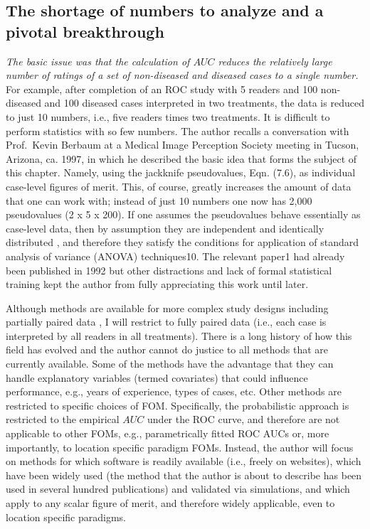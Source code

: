 \documentclass[
]{book}
\begin{document}
\hypertarget{the-shortage-of-numbers-to-analyze-and-a-pivotal-breakthrough}{%
\subsection{The shortage of numbers to analyze and a pivotal breakthrough}\label{the-shortage-of-numbers-to-analyze-and-a-pivotal-breakthrough}}

\emph{The basic issue was that the calculation of \(AUC\) reduces the relatively large number of ratings of a set of non-diseased and diseased cases to a single number.} For example, after completion of an ROC study with 5 readers and 100 non-diseased and 100 diseased cases interpreted in two treatments, the data is reduced to just 10 numbers, i.e., five readers times two treatments. It is difficult to perform statistics with so few numbers. The author recalls a conversation with Prof.~Kevin Berbaum at a Medical Image Perception Society meeting in Tucson, Arizona, ca. 1997, in which he described the basic idea that forms the subject of this chapter. Namely, using the jackknife pseudovalues, Eqn. (7.6), as individual case-level figures of merit. This, of course, greatly increases the amount of data that one can work with; instead of just 10 numbers one now has 2,000 pseudovalues (2 x 5 x 200). If one assumes the pseudovalues behave essentially as case-level data, then by assumption they are independent and identically distributed , and therefore they satisfy the conditions for application of standard analysis of variance (ANOVA) techniques10. The relevant paper1 had already been published in 1992 but other distractions and lack of formal statistical training kept the author from fully appreciating this work until later.

Although methods are available for more complex study designs including partially paired data \citep{RN2128, RN1880}, I will restrict to fully paired data (i.e., each case is interpreted by all readers in all treatments). There is a long history of how this field has evolved and the author cannot do justice to all methods that are currently available. Some of the methods \citep{RN1441, RN2013, RN1451} have the advantage that they can handle explanatory variables (termed covariates) that could influence performance, e.g., years of experience, types of cases, etc. Other methods are restricted to specific choices of FOM. Specifically, the probabilistic approach \citep{RN2253, RN2254, RN2351, RN2080} is restricted to the empirical \(AUC\) under the ROC curve, and therefore are not applicable to other FOMs, e.g., parametrically fitted ROC AUCs or, more importantly, to location specific paradigm FOMs. Instead, the author will focus on methods for which software is readily available (i.e., freely on websites), which have been widely used (the method that the author is about to describe has been used in several hundred publications) and validated via simulations, and which apply to any scalar figure of merit, and therefore widely applicable, even to location specific paradigms.
\end{document}
